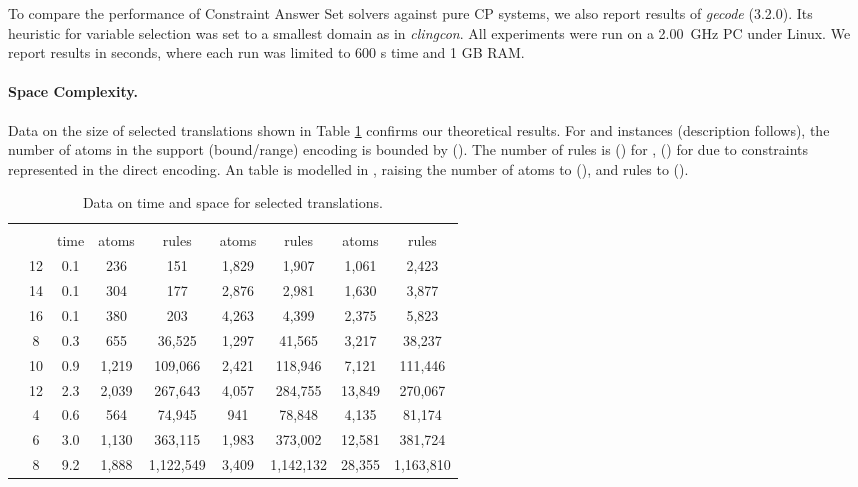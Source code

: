 \documentclass{tlp}
\newcommand{\systemname}[1]{\emph{#1}}
\newcommand{\encsup}{}
\newcommand{\encbou}{}
\newcommand{\encran}{}
\begin{document}
To compare the performance of Constraint Answer Set solvers against pure CP systems, we also report results of \systemname{gecode} (3.2.0). Its heuristic for variable selection was set to a smallest domain as in \systemname{clingcon}.
All experiments were run on a 2.00~GHz PC under Linux. We report results in seconds, where each run was limited to 600 s time and 1 GB RAM.

\paragraph{Space Complexity.} Data on the size of selected translations shown in Table \ref{tab:timespace} confirms our theoretical results. For  and  instances (description follows), the number of atoms in the support (bound/range) encoding is bounded by  (). The number of rules is  () for ,  () for  due to constraints represented in the direct encoding. An  table is modelled in , raising the number of atoms to  (), and rules to  ().
\begin{table}
\caption{Data on time and space for selected translations.}
\label{tab:timespace}
\begin{minipage}{\textwidth}
\begin{tabular}{ccccccccc} \hline\hline
&     & \multicolumn{3}{c}{\encsup} & \multicolumn{2}{c}{\encbou} & \multicolumn{2}{c}{\encran} \\
&  & time & atoms & rules & atoms & rules & atoms & rules \\ \hline
      & 12 & 0.1 & 236 & 151 & 1,829 & 1,907 & 1,061 & 2,423 \\
 & 14 & 0.1 & 304 & 177 & 2,876 & 2,981 & 1,630 & 3,877 \\
      & 16 & 0.1 & 380 & 203 & 4,263 & 4,399 & 2,375 & 5,823 \\ \noalign{\vspace {.2cm}}

      &  8 & 0.3 &   655 &  36,525 & 1,297 &  41,565 &  3,217 &  38,237 \\
 & 10 & 0.9 & 1,219 & 109,066 & 2,421 & 118,946 &  7,121 & 111,446 \\
      & 12 & 2.3 & 2,039 & 267,643 & 4,057 & 284,755 & 13,849 & 270,067 \\ \noalign{\vspace {.2cm}}

      &  4 & 0.6 &   564 &    74,945 &    941 &    78,848 &  4,135 &    81,174 \\
&  6 & 3.0 & 1,130 &   363,115 &  1,983 &   373,002 & 12,581 &   381,724 \\
      &  8 & 9.2 & 1,888 & 1,122,549 &  3,409 & 1,142,132 & 28,355 & 1,163,810 \\ \hline\hline
\end{tabular}
\vspace{-2\baselineskip}
\end{minipage}
\end{table}
\end{document}

